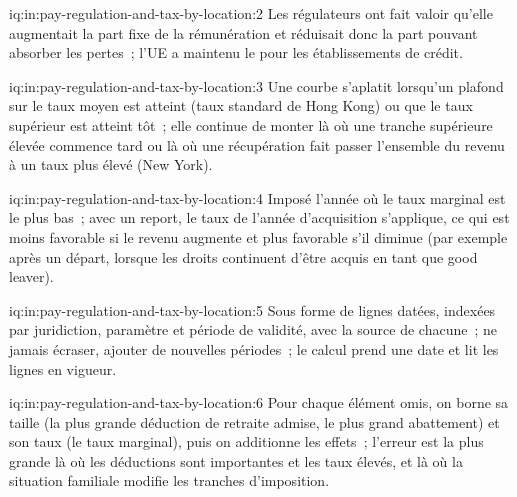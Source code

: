 \begin{solution}{iq:in:pay-regulation-and-tax-by-location:2}
Les régulateurs ont fait valoir qu'elle augmentait la part fixe de la rémunération et réduisait donc la part pouvant absorber les pertes~; l'UE a maintenu le  pour les établissements de crédit.
\end{solution}

\begin{solution}{iq:in:pay-regulation-and-tax-by-location:3}
Une courbe s'aplatit lorsqu'un plafond sur le taux moyen est atteint (taux standard de Hong Kong) ou que le taux supérieur est atteint tôt~; elle continue de
monter là où une tranche supérieure élevée commence tard ou là où une récupération fait passer l'ensemble du revenu à un taux plus élevé (New York).
\end{solution}

\begin{solution}{iq:in:pay-regulation-and-tax-by-location:4}
Imposé l'année où le taux marginal est le plus bas~; avec un report, le taux de l'année d'acquisition s'applique, ce qui est moins favorable si le revenu
augmente et plus favorable s'il diminue (par exemple après un départ, lorsque les droits continuent d'être acquis en tant que good leaver).
\end{solution}

\begin{solution}{iq:in:pay-regulation-and-tax-by-location:5}
Sous forme de lignes datées, indexées par juridiction, paramètre et période de validité, avec la source de chacune~; ne jamais écraser, ajouter de nouvelles
périodes~; le calcul prend une date et lit les lignes en vigueur.
\end{solution}

\begin{solution}{iq:in:pay-regulation-and-tax-by-location:6}
Pour chaque élément omis, on borne sa taille (la plus grande déduction de retraite admise, le plus grand abattement) et son taux (le
taux marginal), puis on additionne les effets~; l'erreur est la plus grande là où les déductions sont importantes et les taux élevés, et là où la situation familiale
modifie les tranches d'imposition.
\end{solution}
